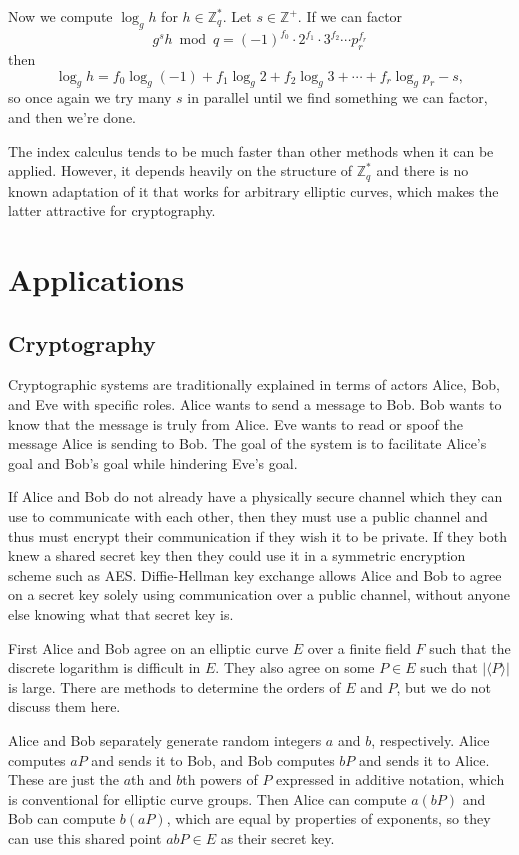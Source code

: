 \documentclass[12pt]{article}
\newcommand*\Z{\mathbb{Z}}
\newcommand*\card[2][]{#1\lvert #2 #1\rvert}
\newcommand*\cyc[2][]{#1\langle #2 #1\rangle}
\begin{document}
Now we compute $\log_g h$ for $h \in \Z_q^*$. Let $s \in \Z^+$. If we can factor
\[ g^sh \bmod q = (-1)^{f_0} \cdot 2^{f_1} \cdot 3^{f_2} \cdots p_r^{f_r} \]
then
\[
  \log_g h
  = f_0 \log_g(-1) + f_1 \log_g 2 + f_2 \log_g 3 + \cdots + f_r \log_g p_r - s,
\]
so once again we try many $s$ in parallel until we find something we can factor,
and then we're done.

The index calculus tends to be much faster than other methods when it can be
applied. However, it depends heavily on the structure of $\Z_q^*$ and there is
no known adaptation of it that works for arbitrary elliptic curves, which makes
the latter attractive for cryptography.

\section{Applications}

\subsection{Cryptography}

Cryptographic systems are traditionally explained in terms of actors Alice, Bob,
and Eve with specific roles. Alice wants to send a message to Bob. Bob wants to
know that the message is truly from Alice. Eve wants to read or spoof the
message Alice is sending to Bob. The goal of the system is to facilitate Alice's
goal and Bob's goal while hindering Eve's goal.

If Alice and Bob do not already have a physically secure channel which they can
use to communicate with each other, then they must use a public channel and thus
must encrypt their communication if they wish it to be private. If they both
knew a shared secret key then they could use it in a symmetric encryption scheme
such as AES. Diffie-Hellman key exchange allows Alice and Bob to agree on a
secret key solely using communication over a public channel, without anyone else
knowing what that secret key is.\cite{dh}

First Alice and Bob agree on an elliptic curve $E$ over a finite field $F$ such
that the discrete logarithm is difficult in $E$. They also agree on some $P \in
E$ such that $\card{\cyc{P}}$ is large. There are methods to determine the
orders of $E$ and $P$, but we do not discuss them here.\cite{book}

Alice and Bob separately generate random integers $a$ and $b$, respectively.
Alice computes $aP$ and sends it to Bob, and Bob computes $bP$ and sends it to
Alice. These are just the $a$th and $b$th powers of $P$ expressed in additive
notation, which is conventional for elliptic curve groups. Then Alice can
compute $a(bP)$ and Bob can compute $b(aP)$, which are equal by properties of
exponents, so they can use this shared point $abP \in E$ as their secret key.
\end{document}
